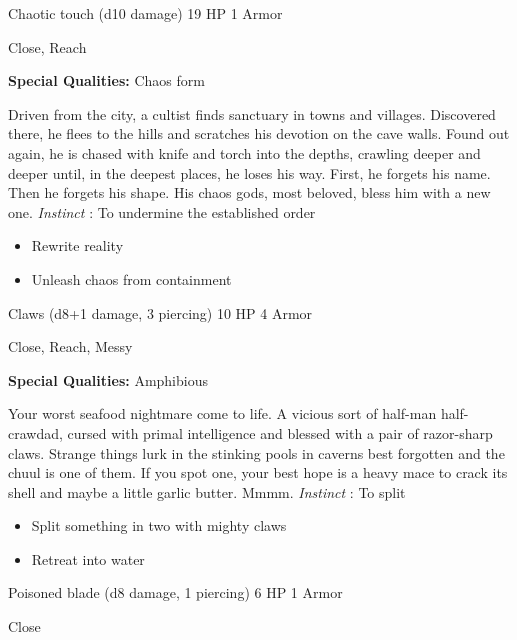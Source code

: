 

 Chaotic touch (d10 damage) 19 HP 1 Armor


 Close, Reach


 \textbf{Special Qualities:}
 Chaos form


 Driven from the city, a cultist finds sanctuary in towns and villages. Discovered there, he flees to the hills and scratches his devotion on the cave walls. Found out again, he is chased with knife and torch into the depths, crawling deeper and deeper until, in the deepest places, he loses his way. First, he forgets his name. Then he forgets his shape. His chaos gods, most beloved, bless him with a new one. \emph{Instinct}
: To undermine the established order
\begin{itemize}
\item Rewrite reality
\item Unleash chaos from containment

\end{itemize}




 Claws (d8+1 damage, 3 piercing) 10 HP 4 Armor


 Close, Reach, Messy


 \textbf{Special Qualities:}
 Amphibious


 Your worst seafood nightmare come to life. A vicious sort of half-man half-crawdad, cursed with primal intelligence and blessed with a pair of razor-sharp claws. Strange things lurk in the stinking pools in caverns best forgotten and the chuul is one of them. If you spot one, your best hope is a heavy mace to crack its shell and maybe a little garlic butter. Mmmm. \emph{Instinct}
: To split
\begin{itemize}
\item Split something in two with mighty claws
\item Retreat into water

\end{itemize}




 Poisoned blade (d8 damage, 1 piercing) 6 HP 1 Armor


 Close


